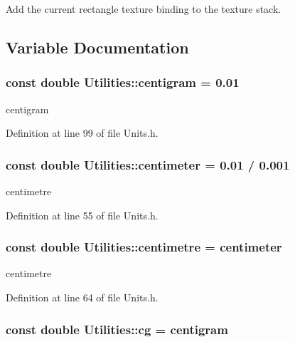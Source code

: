 Add the current rectangle texture binding to the texture stack. 



\subsection{Variable Documentation}
\hypertarget{namespace_utilities_ae4b25dba2b30ec640f00b47acb80ff34}{
\subsubsection[{centigram}]{\setlength{\rightskip}{0pt plus 5cm}const double {\bf Utilities::centigram} = 0.01}}
\label{namespace_utilities_ae4b25dba2b30ec640f00b47acb80ff34}


centigram 



Definition at line 99 of file Units.h.

\hypertarget{namespace_utilities_a17483d8b3688f5a3786b48f4ed70588c}{
\subsubsection[{centimeter}]{\setlength{\rightskip}{0pt plus 5cm}const double {\bf Utilities::centimeter} = 0.01 / 0.001}}
\label{namespace_utilities_a17483d8b3688f5a3786b48f4ed70588c}


centimetre 



Definition at line 55 of file Units.h.

\hypertarget{namespace_utilities_a8f332608b463f7e22df3b1120be2cba2}{
\subsubsection[{centimetre}]{\setlength{\rightskip}{0pt plus 5cm}const double {\bf Utilities::centimetre} = {\bf centimeter}}}
\label{namespace_utilities_a8f332608b463f7e22df3b1120be2cba2}


centimetre 



Definition at line 64 of file Units.h.

\hypertarget{namespace_utilities_a8657e04ecc892b1e9a3b84db62bf94df}{
\subsubsection[{cg}]{\setlength{\rightskip}{0pt plus 5cm}const double {\bf Utilities::cg} = {\bf centigram}}}
\label{namespace_utilities_a8657e04ecc892b1e9a3b84db62bf94df}


